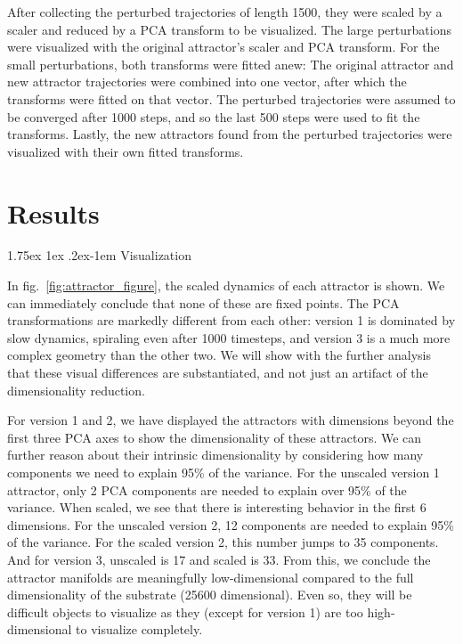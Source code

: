 \documentclass[letterpaper]{article}
\makeatletter
\renewcommand{\paragraph}{%
  \@startsection{paragraph}{4}%
  {\z@}{1.75ex \@plus 1ex \@minus .2ex}{-1em}%
  {\normalfont\normalsize\bfseries}%
}
\makeatother
\begin{document}
After collecting the perturbed trajectories of length 1500, they were scaled by a scaler and reduced by a PCA transform to be visualized. The large perturbations were visualized with the original attractor's scaler and PCA transform. For the small perturbations, both transforms were fitted anew: The original attractor and new attractor trajectories were combined into one vector, after which the transforms were fitted on that vector. The perturbed trajectories were assumed to be converged after 1000 steps, and so the last 500 steps were used to fit the transforms. Lastly, the new attractors found from the perturbed trajectories were visualized with their own fitted transforms. 

\section{Results}

\paragraph{Visualization} 


In fig.\ \ref{fig:attractor_figure}, the scaled dynamics of each attractor is shown. We can immediately conclude that none of these are fixed points. The PCA transformations are markedly different from each other: version 1 is dominated by slow dynamics, spiraling even after 1000 timesteps, and version 3 is a much more complex geometry than the other two. We will show with the further analysis that these visual differences are substantiated, and not just an artifact of the dimensionality reduction. 

For version 1 and 2, we have displayed the attractors with dimensions beyond the first three PCA axes to show the dimensionality of these attractors. We can further reason about their intrinsic dimensionality by considering how many components we need to explain 95\% of the variance. For the unscaled version 1 attractor, only 2 PCA components are needed to explain over 95\% of the variance. When scaled, we see that there is interesting behavior in the first 6 dimensions. For the unscaled version 2, 12 components are needed to explain 95\% of the variance. For the scaled version 2, this number jumps to 35 components. And for version 3, unscaled is 17 and scaled is 33. From this, we conclude the attractor manifolds are meaningfully low-dimensional compared to the full dimensionality of the substrate (25600 dimensional). Even so, they will be difficult objects to visualize as they (except for version 1) are too high-dimensional to visualize completely. 
\end{document}

